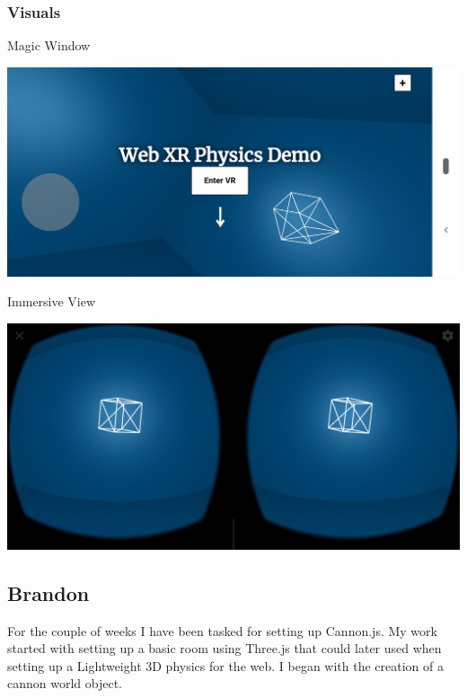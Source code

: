 \documentclass[onecolumn, draftclsnofoot,10pt, compsoc]{IEEEtran}
\begin{document}
    \subsubsection{Visuals}
    Magic Window
    
    \includegraphics[width=\linewidth]{images/MagicWindow.png}
    
    Immersive View
    
    \includegraphics[width=\linewidth]{images/ImmersiveView.png}
    
\subsection{Brandon}
   For the couple of weeks I have been tasked for setting up Cannon.js. My work started with setting up a basic room using Three.js that could later used when setting up a Lightweight 3D physics for the web. I began with the creation of a cannon world object.
   
\end{document}
